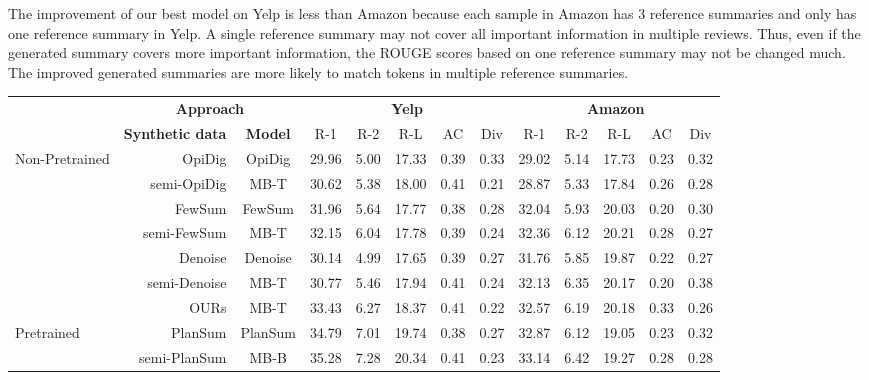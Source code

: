 The improvement of our best model on Yelp is less than Amazon
because each sample in Amazon has 3 reference summaries and only has one reference summary in Yelp.
A single reference summary may not cover all important information in multiple reviews.
Thus, even if the generated summary covers
more important information,
the ROUGE scores based on one reference summary may not be changed much.
The improved generated summaries are more likely to match tokens
in multiple reference summaries. 


\begin{table*}[th]
	\begin{center}
		\scriptsize
		\begin{tabular}{|l|r|c|c|c|c|c|c|c|c|c|c|c|}
			\hline
			\multirow{2}{*}{}&\multicolumn{2}{c|}{\bf Approach} & \multicolumn{5}{c|}{\bf Yelp} &  \multicolumn{5}{c|}{\bf Amazon} \\ \cline{2-13}	
			&\textbf{Synthetic data} & \textbf{Model} & R-1 & R-2 & R-L & AC & Div & R-1 & R-2 & R-L & AC & Div \\ 
			\hline
			\multirow{7}{*}{Non-Pretrained}&OpiDig & OpiDig & 29.96 &5.00 & 17.33& 0.39 & 0.33 & 29.02 & 5.14 & 17.73 & 0.23 & 0.32 \\
			\cline{2-13}	 
			&semi-OpiDig& MB-T & 30.62 & 5.38 & 18.00 & 0.41 & 0.21 &28.87 & 5.33& 17.84 & 0.26 & 0.28\\
			\cline{2-13}
			&FewSum & FewSum & 31.96 & 5.64 & 17.77 & 0.38 & 0.28 & 32.04 & 5.93 & 20.03 & 0.20 & 0.30 \\
			\cline{2-13}
			&semi-FewSum & MB-T & 32.15 & 6.04 & 17.78 & 0.39 & 0.24 &32.36 & 6.12& 20.21 & 0.28 & 0.27\\
			\cline{2-13}	 
			&Denoise & Denoise& 30.14 & 4.99 & 17.65& 0.39 & 0.27 &31.76 & 5.85 & 19.87 & 0.22 & 0.27  \\
			\cline{2-13} 
			&semi-Denoise & MB-T & 30.77 & 5.46& 17.94 & 0.41 & 0.24 & 32.13& 6.35& 20.17 & 0.20 & 0.38 \\
			\cline{2-13} 
			&OURs & MB-T & 33.43 & 6.27 & 18.37& 0.41 & 0.22 & 32.57 & 6.19 & 20.18 & 0.33 & 0.26 \\ 
			\hline
			\multirow{5}{*}{Pretrained} & PlanSum & PlanSum & 34.79&7.01 &19.74 &0.38 & 0.27 & 32.87 &6.12 & 19.05 & 0.23 & 0.32\\  
			\cline{2-13}
			&semi-PlanSum& MB-B & 35.28& 7.28& 20.34& 0.41 & 0.23 & 33.14 & 6.42 &  19.27& 0.28 & 0.28 \\

\end{tabular}
\end{center}
\end{table*}
